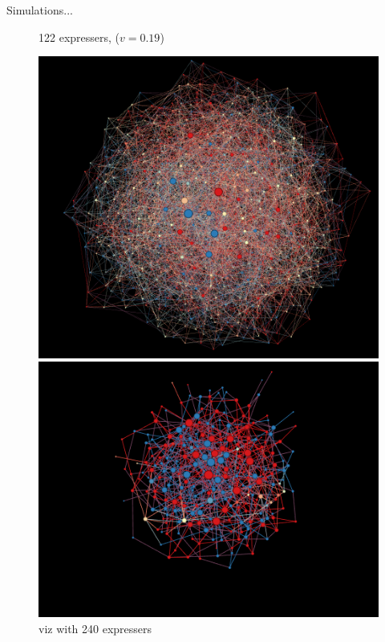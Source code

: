 \documentclass[xcolor=table,handout]{beamer}
\begin{document}
\begin{frame}{Simulations...}
\begin{figure}
\begin{minipage}{.5\textwidth}
  \caption{122 expressers, ($v=0.19$)  }
\end{minipage}
\end{figure}

\end{frame}

\begin{frame}

\begin{figure}
\hspace{0.2cm}
\begin{minipage}{.5\textwidth}
  \includegraphics[scale = 0.25]{./img/pol_higher.png}
  \caption{viz with 240 expressers}
\end{minipage}%
\begin{minipage}{.5\textwidth}
  \includegraphics[scale = 0.23]{./img/pol_higher1.png}

\end{minipage}
\end{figure}
\end{frame}
\end{document}
